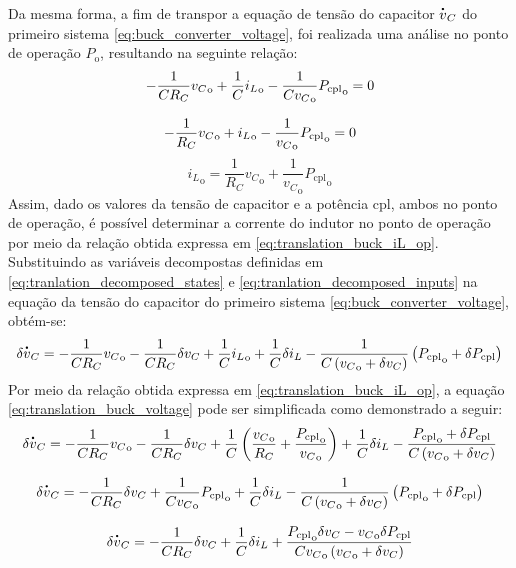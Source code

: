 Da mesma forma, a fim de transpor a equação de tensão do capacitor $\dt{v}_C$ do primeiro sistema \eqref{eq:buck_converter_voltage}, foi realizada uma análise no ponto de operação $P_{\mathrm{o}}$, resultando na seguinte relação: \begin{gather}
  - \frac{1}{C R_C} {v_C}_{\mathrm{o}} + \frac{1}{C} {i_L}_{\mathrm{o}} - \frac{1}{C {v_C}_{\mathrm{o}}} {P_{\mathrm{cpl}}}_{\mathrm{o}} = 0 \notag \\[8pt]
  - \frac{1}{R_C} {v_C}_{\mathrm{o}} + {i_L}_{\mathrm{o}} - \frac{1}{{v_C}_{\mathrm{o}}} {P_{\mathrm{cpl}}}_{\mathrm{o}} = 0 \notag
\end{gather} \begin{equation}{i_L}_{\mathrm{o}} = \frac{1}{R_C} {v_C}_{\mathrm{o}} + \frac{1}{{v_C}_{\mathrm{o}}} {P_{\mathrm{cpl}}}_{\mathrm{o}} \label{eq:translation_buck_iL_op}\end{equation} Assim, dado os valores da tensão de capacitor e a potência \acrshort{cpl}, ambos no ponto de operação, é possível determinar a corrente do indutor no ponto de operação por meio da relação obtida expressa em \eqref{eq:translation_buck_iL_op}. Substituindo as variáveis decompostas definidas em \eqref{eq:tranlation_decomposed_states} e \eqref{eq:tranlation_decomposed_inputs} na equação da tensão do capacitor do primeiro sistema \eqref{eq:buck_converter_voltage}, obtém-se: \begin{equation}
  \delta \dt{v}_C = - \frac{1}{C R_C} {v_C}_{\mathrm{o}} - \frac{1}{C R_C} \delta v_C + \frac{1}{C} {i_L}_{\mathrm{o}} + \frac{1}{C}  \delta i_L - \frac{1}{C \left({v_C}_{\mathrm{o}} + \delta v_C\right)} \left({P_{\mathrm{cpl}}}_{\mathrm{o}} + \delta P_{\mathrm{cpl}}\right) \label{eq:translation_buck_voltage}
\end{equation} Por meio da relação obtida expressa em \eqref{eq:translation_buck_iL_op}, a equação \eqref{eq:translation_buck_voltage} pode ser simplificada como demonstrado a seguir: \begin{gather}
  \delta \dt{v}_C = - \frac{1}{C R_C} {v_C}_{\mathrm{o}} - \frac{1}{C R_C} \delta v_C + \frac{1}{C} \left(\frac{{v_C}_{\mathrm{o}}}{R_C} + \frac{{P_{\mathrm{cpl}}}_{\mathrm{o}}}{{v_C}_{\mathrm{o}}}\right) + \frac{1}{C}  \delta i_L - \frac{{P_{\mathrm{cpl}}}_{\mathrm{o}} + \delta P_{\mathrm{cpl}}}{C \left({v_C}_{\mathrm{o}} + \delta v_C\right)} \notag \\[8pt]
  \delta \dt{v}_C = - \frac{1}{C R_C} \delta v_C + \frac{1}{C {v_C}_{\mathrm{o}}} {P_{\mathrm{cpl}}}_{\mathrm{o}} + \frac{1}{C}  \delta i_L - \frac{1}{C \left({v_C}_{\mathrm{o}} + \delta v_C\right)} \left({P_{\mathrm{cpl}}}_{\mathrm{o}} + \delta P_{\mathrm{cpl}}\right) \notag \\[8pt]
  \delta \dt{v}_C = - \frac{1}{C R_C} \delta v_C  + \frac{1}{C}  \delta i_L + \frac{{P_{\mathrm{cpl}}}_{\mathrm{o}} \delta v_C - {v_C}_{\mathrm{o}} \delta P_{\mathrm{cpl}}}{C {v_C}_{\mathrm{o}} \left({v_C}_{\mathrm{o}} + \delta v_C\right)}
\end{gather}

